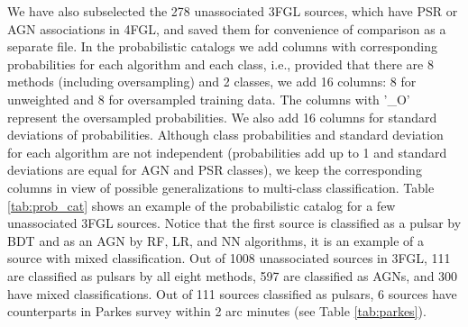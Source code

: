 We have also subselected the 278 unassociated 3FGL sources, which have PSR or AGN associations in 4FGL,
and saved them for convenience of comparison as a separate file.
In the probabilistic catalogs we add columns with corresponding probabilities for each algorithm and each class,
i.e., provided that there are 8 methods (including oversampling) and 2 classes, we add 16 columns: 8 for unweighted and 8 for oversampled training data. The columns with '\_O' represent the oversampled probabilities. We also add 16 columns for standard deviations of probabilities. Although class probabilities and standard deviation for each algorithm are not independent (probabilities add up to 1 and standard deviations are equal for AGN and PSR classes), we keep the corresponding columns in view of possible generalizations to multi-class classification.
Table \ref{tab:prob_cat} shows an example of the probabilistic catalog for a few unassociated 3FGL sources.
Notice that the first source is classified as a pulsar by BDT and as an AGN by RF, LR, and NN algorithms,
it is an example of a source with mixed classification.
Out of 1008 unassociated sources in 3FGL, 111 are classified as pulsars by all eight methods, 597 are classified as AGNs, and 300 have mixed classifications.
Out of 111 sources classified as pulsars, 6 sources have counterparts in Parkes survey \citep{Camilo2015} within 2 arc minutes (see Table \ref{tab:parkes}).

